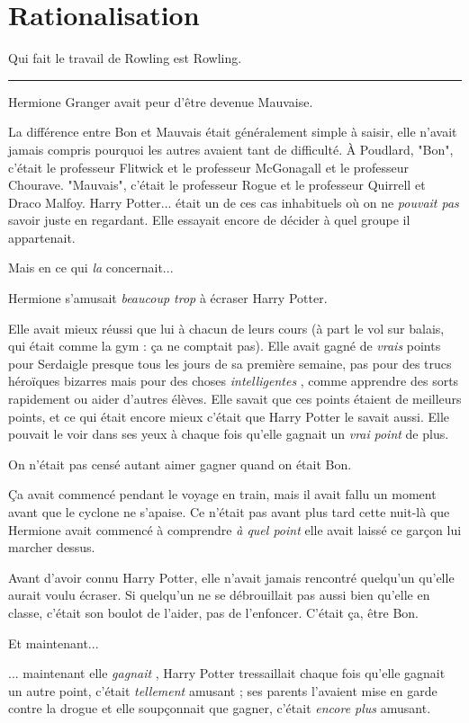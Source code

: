 
\chapter{Rationalisation}

Qui fait le travail de Rowling est Rowling.
\par\noindent\rule{\textwidth}{0.4pt}
Hermione Granger avait peur d'être devenue Mauvaise.

La différence entre Bon et Mauvais était généralement simple à saisir, elle n'avait jamais compris pourquoi les autres avaient tant de difficulté. À Poudlard, "Bon", c'était le professeur Flitwick et le professeur McGonagall et le professeur Chourave. "Mauvais", c'était le professeur Rogue et le professeur Quirrell et Draco Malfoy. Harry Potter... était un de ces cas inhabituels où on ne \emph{pouvait pas}  savoir juste en regardant. Elle essayait encore de décider à quel groupe il appartenait.

Mais en ce qui \emph{la}  concernait...

Hermione s'amusait \emph{beaucoup trop } à écraser Harry Potter.

Elle avait mieux réussi que lui à chacun de leurs cours (à part le vol sur balais, qui était comme la gym : ça ne comptait pas). Elle avait gagné de \emph{vrais}  points pour Serdaigle presque tous les jours de sa première semaine, pas pour des trucs héroïques bizarres mais pour des choses \emph{intelligentes} , comme apprendre des sorts rapidement ou aider d'autres élèves. Elle savait que ces points étaient de meilleurs points, et ce qui était encore mieux c'était que Harry Potter le savait aussi. Elle pouvait le voir dans ses yeux à chaque fois qu'elle gagnait un \emph{vrai}  \emph{point } de plus.

On n'était pas censé autant aimer gagner quand on était Bon.

Ça avait commencé pendant le voyage en train, mais il avait fallu un moment avant que le cyclone ne s'apaise. Ce n'était pas avant plus tard cette nuit-là que Hermione avait commencé à comprendre \emph{à quel point}  elle avait laissé ce garçon lui marcher dessus.

Avant d'avoir connu Harry Potter, elle n'avait jamais rencontré quelqu'un qu'elle aurait voulu écraser. Si quelqu'un ne se débrouillait pas aussi bien qu'elle en classe, c'était son boulot de l'aider, pas de l'enfoncer. C'était ça, être Bon.

Et maintenant...

... maintenant elle \emph{gagnait} , Harry Potter tressaillait chaque fois qu'elle gagnait un autre point, c'était \emph{tellement}  amusant ; ses parents l'avaient mise en garde contre la drogue et elle soupçonnait que gagner, c'était \emph{encore plus}  amusant.

